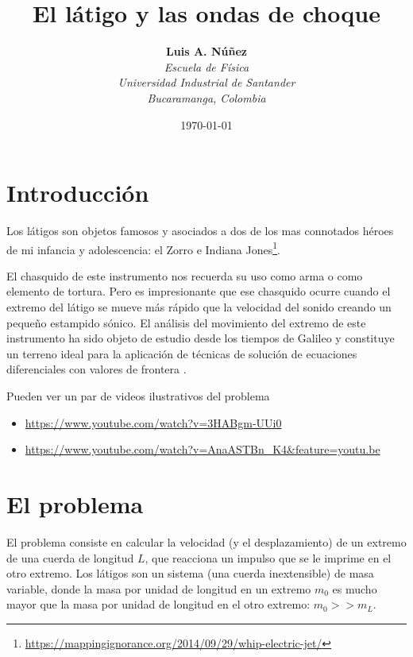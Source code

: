 \documentclass[spanish,notitlepage,letterpaper,11pt]{article} %
\begin{document}
\title{El látigo y las ondas de choque}
\author{
\textbf{Luis A. Núñez} \\ 
\textit{Escuela de Física} \\ \textit{Universidad Industrial de Santander} \\ 
\textit{Bucaramanga, Colombia}
}
\date{\today}
\maketitle


\section{Introducción}
Los látigos son objetos famosos y asociados a dos de los mas connotados héroes de mi infancia y adolescencia: el Zorro e Indiana Jones\footnote{\url{https://mappingignorance.org/2014/09/29/whip-electric-jet/}}. 

El chasquido de este instrumento nos recuerda su uso como arma o como elemento de tortura. Pero es impresionante que ese chasquido ocurre cuando el extremo del látigo se mueve más rápido que la velocidad del sonido creando un pequeño estampido sónico\cite{BernsteinHallTrent1958,GorielyMcMillen2002}.  El análisis del movimiento del extremo de  este instrumento ha sido objeto de estudio desde los tiempos de Galileo y constituye un terreno ideal para la aplicación de técnicas de solución de ecuaciones diferenciales con valores de frontera \cite{Preston2011,Telciyan2018}.

Pueden ver un par de videos ilustrativos del problema 
\begin{itemize}
    \item \url{https://www.youtube.com/watch?v=3HABgm-UUi0}
    \item \url{https://www.youtube.com/watch?v=AnaASTBn_K4&feature=youtu.be}
\end{itemize}

\section{El problema}
El problema consiste en calcular la velocidad (y el desplazamiento) de un extremo de una cuerda de longitud $L$, que reacciona un impulso que se le imprime en el otro extremo. Los látigos son un sistema (una cuerda inextensible) de masa variable, donde la masa por unidad de longitud en un extremo $m_{0}$ es mucho mayor que la masa por unidad de longitud en  el otro extremo: $m_{0} >> m_{L}$.
\end{document}
